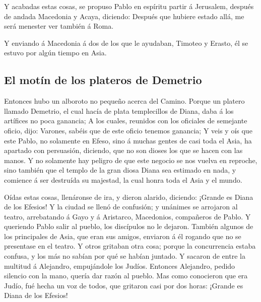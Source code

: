  Y acabadas estas cosas, se propuso Pablo en espíritu
partir á Jerusalem, después de andada Macedonia y Acaya, diciendo:
Después que hubiere estado allá, me será menester ver también á Roma.

 Y enviando á Macedonia á dos de los que le ayudaban,
Timoteo y Erasto, él se estuvo por algún tiempo en Asia.

\hypertarget{el-motuxedn-de-los-plateros-de-demetrio}{%
\subsection{El motín de los plateros de
Demetrio}\label{el-motuxedn-de-los-plateros-de-demetrio}}

 Entonces hubo un alboroto no pequeño acerca del Camino.
 Porque un platero llamado Demetrio, el cual hacía de
plata templecillos de Diana, daba á los artífices no poca ganancia;
 A los cuales, reunidos con los oficiales de semejante
oficio, dijo: Varones, sabéis que de este oficio tenemos ganancia;
 Y veis y oís que este Pablo, no solamente en Efeso, sino
á muchas gentes de casi toda el Asia, ha apartado con persuasión,
diciendo, que no son dioses los que se hacen con las manos.
 Y no solamente hay peligro de que este negocio se nos
vuelva en reproche, sino también que el templo de la gran diosa Diana
sea estimado en nada, y comience á ser destruída su majestad, la cual
honra toda el Asia y el mundo.

 Oídas estas cosas, llenáronse de ira, y dieron alarido,
diciendo: ¡Grande es Diana de los Efesios!  Y la ciudad
se llenó de confusión; y unánimes se arrojaron al teatro, arrebatando á
Gayo y á Aristarco, Macedonios, compañeros de Pablo.  Y
queriendo Pablo salir al pueblo, los discípulos no le dejaron.
 También algunos de los principales de Asia, que eran sus
amigos, enviaron á él rogando que no se presentase en el teatro.
 Y otros gritaban otra cosa; porque la concurrencia
estaba confusa, y los más no sabían por qué se habían juntado.
 Y sacaron de entre la multitud á Alejandro, empujándole
los Judíos. Entonces Alejandro, pedido silencio con la mano, quería dar
razón al pueblo.  Mas como conocieron que era Judío, fué
hecha un voz de todos, que gritaron casi por dos horas: ¡Grande es Diana
de los Efesios!

